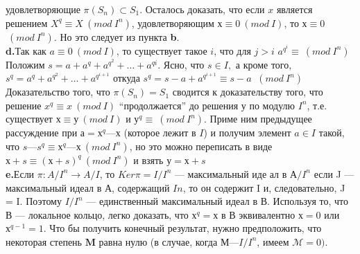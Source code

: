 удовлетворяющие $\pi(S_n) \subset S_1$. Осталось доказать, что если $x$ является
решением $X^{q} \equiv X ~(mod~ I^{n})$, удовлетворяющим $х \equiv 0 ~(mod~ I)$, то $х \equiv 0$
$~(mod~ I^{n})$. Но это следует из пункта \textbf{b}.\\
\hspace*{15pt}\textbf{d.}Так как $a \equiv 0 ~(mod~ I)$, то существует такое $i$, что для $j > i$\linebreak
$a^{q^{i}} \equiv ~(mod~ I^{n})$ Положим $s = a + a^{q} + a^{q^{2}} +\ldots+ a^{q{i}}$. Ясно, что $s \in I,$\linebreak
а кроме того, $s^{q} = a^{q}+ a^{q^{2}} +\ldots+ a^{q^{i+1}}$ откуда $s^{q} = s - a + a^{q^{i+1}} \equiv s - a$\linebreak
$~(mod~ I^{n})$\\
\hspace*{15pt}Доказательство того, что $\pi(S_n) = S_1$ сводится к доказательству
того, что решение $x^{q} \equiv x ~(mod~ I)$ “продолжается” до решения у по
модулю $I^{n}$, т.е. существует $х \equiv у ~(mod~ I)$ и $у^{q} \equiv ~(mod~ I^{n} )$. Приме­
ним предыдущее рассуждение при $а = х^{q} — х$ (которое лежит в $I$) и
получим элемент $a \in I$ такой, что $s — s^{q} \equiv х^{q} — х ~(mod~ I^{n})$, но это
можно переписать в виде $х + s \equiv (х + s)^{q} ~(mod~ I^{n})$ и взять $у = х + s$\\
\hspace*{15pt}\textbf{e.}Если $\pi : A/I^{n} \rightarrow A/I$, то $Ker\pi = I/I^{n}$ --- максимальный иде­
ал в $А/I^{n}$ если J — максимальный идеал в А, содержащий $I{n}$, то он
содержит I и, следовательно, J = I. Поэтому $I/I^{n}$ --- единственный
максимальный идеал в В. Используя то, что В — локальное кольцо,
легко доказать, что $х^{q} = х$ в В эквивалентно $х = 0$ или $х^{q-1} = 1$. Что­
бы получить конечный результат, нужно предположить, что некоторая
степень $\textbf{M}$ равна нулю (в случае, когда $\mathcal{М} — I/I^{n}$, имеем $\mathcal{M} = 0)$.
\newpage
%
